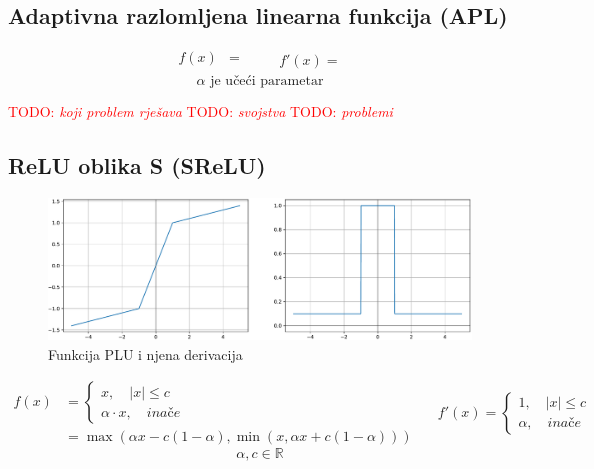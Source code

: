 \documentclass[times, utf8, numeric, diplomski]{fer}
\def\realnum{\mathbb{R}}
\def\otherwise{\textit{inače}}
\def\TODO#1{\noindent\textcolor{red}{TODO: \textit{#1}}\newline}
\def\todo#1{\TODO{#1}}
\def\todoimg#1{\begin{center} \textcolor{red}{\big[ IMAGE: \textit{#1} \big]} \end{center}}
\begin{document}
\subsection{Adaptivna razlomljena linearna funkcija (APL)}

\todoimg{}

\begin{equation}
\begin{split}
f(x) &=  \\
\end{split}
\qquad
\begin{split}
f'(x) = 
\end{split}
\end{equation}
\begin{equation*}
\alpha \text{ je učeći parametar}
\end{equation*}

\todo{koji problem rješava}
\todo{svojstva}
\todo{problemi}

\subsection{ReLU oblika S (SReLU)}

\begin{figure}[H]
\includegraphics[width=\textwidth]{PLU.pdf}
\centering
\caption{Funkcija PLU i njena derivacija}
\end{figure}

\begin{equation}
\begin{split}
f(x) &=
\begin{cases}
x, \quad |x| \leq c \\
\alpha \cdot x, \quad \otherwise
\end{cases} \\
&= \max(\alpha x - c(1-\alpha), \min(x, \alpha x + c (1-\alpha)))
\end{split}
\quad
\begin{split}
f'(x) =
\begin{cases}
1, \quad |x| \leq c \\
\alpha, \quad \otherwise
\end{cases}
\end{split}
\end{equation}
\begin{equation*}
\alpha, c \in \realnum
\end{equation*}
\end{document}

